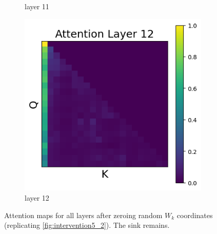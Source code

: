 \documentclass[11pt]{article}
\begin{document}
\begin{figure}[t]
\begin{subfigure}[t]{0.24\textwidth}
    \caption{layer 11}
  \end{subfigure}\hfill
  \begin{subfigure}[t]{0.24\textwidth}
    \centering
    \includegraphics[width=1.4\columnwidth]{figures/intervention5_2/layer_12.png}
    \caption{layer 12}
  \end{subfigure}\hfill

  \caption{Attention maps for all layers after zeroing random $W_k$ coordinates (replicating \cref{fig:intervention5_2}). The sink remains.}
\end{figure}
\end{document}
